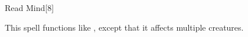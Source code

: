 \begin{spellsection}[Mass]{Read Mind}[8]
    \begin{spellheader}
    \end{spellheader}
    \begin{spellcontent}
        \begin{spelltargetinginfo}
        \end{spelltargetinginfo}
        \begin{spelleffects}
            \spellspecial This spell functions like , except that it affects multiple creatures.
        \end{spelleffects}
    \end{spellcontent}
    \begin{spellfooter}
        \miscastexplode
    \end{spellfooter}
\end{spellsection}

